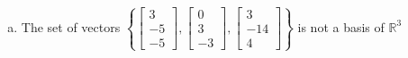 \begin{exerciseAnswer}
\begin{enumerate}[(a)]
\item The set of vectors \( \left\{ \left[\begin{array}{c}
3 \\
-5 \\
-5
\end{array}\right] , \left[\begin{array}{c}
0 \\
3 \\
-3
\end{array}\right] , \left[\begin{array}{c}
3 \\
-14 \\
4
\end{array}\right] \right\} \) is not a basis of \(\mathbb{R}^3\)
\end{enumerate}
    
\end{exerciseAnswer}
    
